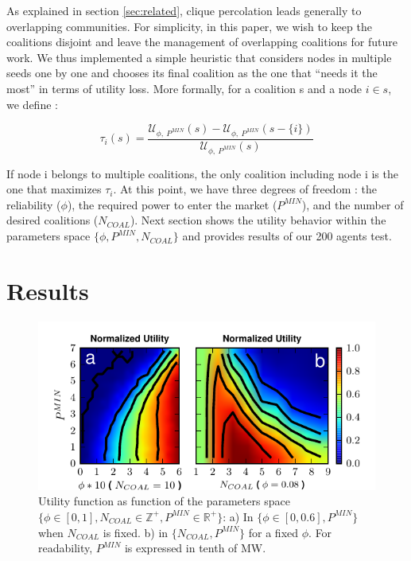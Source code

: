 \documentclass[conference]{IEEEtran}
\begin{document}
As explained in section \ref{sec:related}, clique percolation leads generally to overlapping communities. For simplicity, in this paper, we wish to keep the coalitions disjoint and  leave the management of overlapping coalitions for future work. We thus implemented a simple heuristic that considers nodes in multiple seeds one by one and chooses its final coalition as the one that “needs it the most” in terms of utility loss. More formally, for a coalition s and a node $ i \in s $, we define :

\begin{equation}
\tau_{i}(s) = \dfrac{\mathcal{U}_{\phi,\ P^{MIN}}(s) - \mathcal{U}_{\phi,\ P^{MIN}}(s-\{i\}) }{\mathcal{U}_{\phi,\ P^{MIN}}(s)}
\label{tau}
\end{equation}

If node i belongs to  multiple coalitions, the only coalition including node i is the one that maximizes $ \tau_{i} $. At this point, we have three degrees of freedom : the reliability ($ \phi $), the required power to enter the market ($P^{MIN}$), and the number of desired coalitions ($ N_{COAL} $). Next section shows the utility behavior within the parameters space $ \{\phi,P^{MIN},N_{COAL} \} $ and provides results of our 200 agents test.

\section{Results}
\label{sec:results}

\begin{figure}
 \centering
  \includegraphics[scale=0.9]{./figure9/util}
\caption{Utility function as function of the parameters space $\{\phi \in [0,1], N_{COAL}\in \mathbb{Z}^+, P^{MIN} \in \mathbb{R}^+\}$: a) In $ \{\phi \in [0,0.6], P^{MIN}\} $ when $ N_{COAL} $ is fixed. b) in $ \{N_{COAL}, P^{MIN}\} $ for a fixed $ \phi $. For readability, $ P^{MIN} $ is expressed in tenth of MW.}
\label{Fig2}
\end{figure}
\end{document}
